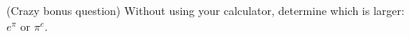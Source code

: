 {(Crazy bonus question) Without using your calculator, determine which is larger: $e^{\pi}$ or $\pi^{e}$.}
{}
